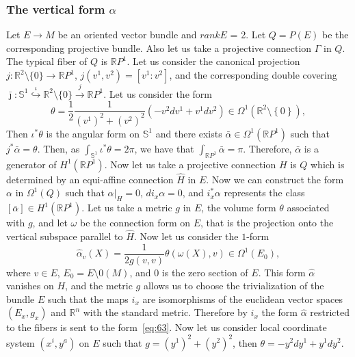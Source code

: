 \documentclass[12pt,letterpaper]{amsart}
\theoremstyle{definition}
\theoremstyle{plain}
\theoremstyle{remark}
\begin{document}
\subsubsection{The vertical form $\alpha$}
\label{subsubsec:4_3_2}
Let $E \to M$ be an oriented vector bundle and $rank E$ = 2.
Let $Q = P(E)$ be the corresponding projective bundle.
Also let us take a projective connection $\Gamma$ in $Q$.
The typical fiber of $Q$ is $\mathbb{R}P^1$.
Let us consider the canonical projection $j : \mathbb{R}^2\setminus \{0\} \to \mathbb{R}P^1$, $j(v^1, v^2) = [v^1 : v^2]$, and the corresponding double covering
$\bar \jmath : \mathbb{S}^1 \overset{\iota}{\hookrightarrow} \mathbb{R}^2\setminus \{0\} \overset{j}{\rightarrow} \mathbb{R}P^1$.
Let us consider the form
\begin{equation}
\theta = \frac{1}{2} \frac{1}{(v^1)^2 + (v^2)^2} \left(-v^2 dv^1 + v^1 dv^2\right) \in \Omega^1(\mathbb{R}^2 \setminus \left\{ 0 \right\}),
\label{eq:63}
\end{equation}
Then $\iota^*\theta$ is the angular form on $\mathbb{S}^1$ and there exists $\bar\alpha \in \Omega^1(\mathbb{R}P^1)$ such that
$j^*\bar\alpha = \theta$.
Then, as $\int_{\mathbb{S}^1} \iota^*\theta = 2\pi$, we have that $\int_{\mathbb{R}P^1} \bar\alpha = \pi$.
Therefore, $\bar\alpha$ is a generator of $H^1(\mathbb{R}P^1)$.
Now let us take a projective connection $H$ is $Q$ which is determined by an equi-affine connection $\hat H$ in $E$.
Now we can construct the form $\alpha$ in $\Omega^1(Q)$ such that $\left.\alpha\right|_H = 0$, $d i_x \alpha = 0$, and $i_x^*\alpha$ represents the class $[\bar \alpha] \in H^1(\mathbb{R}P^1)$.
Let us take a metric $g$ in $E$, the volume form $\theta$ associated with $g$, and let $\omega$ be the connection form on $E$, that is the projection onto the vertical subspace parallel to $\hat H$.
Now let us consider the $1$-form
\begin{equation}
\hat\alpha_v(X) = \frac{1}{2 g(v, v)}\theta(\omega(X), v) \in \Omega^1(E_0),
\label{eq:64}
\end{equation}
where $v \in E$, $E_0 = E \setminus 0(M)$, and $0$ is the zero section of $E$.
This form $\hat\alpha$ vanishes on $H$, and the metric $g$ allows us to choose the trivialization of the bundle $E$ such that the maps $i_x$ are isomorphisms of the euclidean vector spaces $(E_x, g_x)$ and $\mathbb{R}^n$ with the standard metric.
Therefore by $i_x$ the form $\hat\alpha$ restricted to the fibers is sent to the form~\eqref{eq:63}.
Now let us consider local coordinate system $(x^i, y^a)$ on $E$ such that $g = (y^1)^2 + (y^2)^2$, then $\theta = -y^2 dy^1 + y^1 dy^2$.
\end{document}
